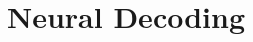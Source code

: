 \chapter{ Neural Decoding}
\label{cha:Neural Decoding}

\begin{multicols}{2}
\setlength{\columnseprule}{0.2pt}  










\end{multicols}


